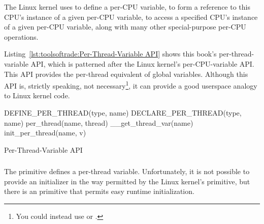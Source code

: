 The Linux kernel uses  to define a per-CPU variable,
 to form a reference to this CPU's instance of a
given per-CPU variable,  to access a specified CPU's
instance of a given per-CPU variable, along with many other special-purpose
per-CPU operations.

Listing~\ref{lst:toolsoftrade:Per-Thread-Variable API}
shows this book's per-thread-variable API, which is patterned
after the Linux kernel's per-CPU-variable API\@.
This API provides the per-thread equivalent of global variables.
Although this API is, strictly speaking, not necessary\footnote{
	You could instead use  or .},
it can provide a good userspace analogy to Linux kernel code.

\begin{listing}[tbp]
\begin{VerbatimL}[numbers=none]
DEFINE_PER_THREAD(type, name)
DECLARE_PER_THREAD(type, name)
per_thread(name, thread)
__get_thread_var(name)
init_per_thread(name, v)
\end{VerbatimL}
\caption{Per-Thread-Variable API}
\label{lst:toolsoftrade:Per-Thread-Variable API}
\end{listing}

\QuickQuizEnd

\subsubsection{}

The  primitive defines a per-thread variable.
Unfortunately, it is not possible to provide an initializer in the way
permitted by the Linux kernel's  primitive,
but there is an  primitive that permits easy
runtime initialization.

